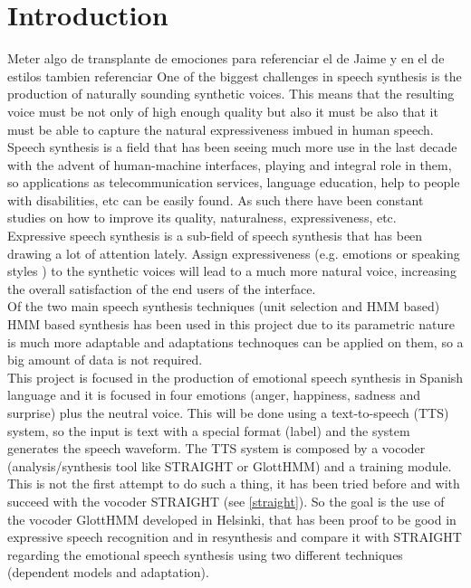 \section{Introduction}\label{introduction}
Meter algo de transplante de emociones para referenciar el de Jaime y en el de estilos tambien referenciar
One of the biggest challenges in speech synthesis is the production of naturally sounding synthetic voices. This means that the resulting voice must be not only of high enough quality but also it must be also that it must be able to capture the natural expressiveness imbued in human speech.\\
Speech synthesis is a field that has been seeing much more use in the last decade with the advent of human-machine interfaces, playing and integral role in them, so applications as telecommunication services, language education, help to people with disabilities, etc can be easily found. As such there have been constant studies on how to improve its quality, naturalness, expressiveness, etc.\\
Expressive speech synthesis is a sub-field of speech synthesis that has been drawing a lot of attention lately. Assign expressiveness (e.g. emotions \cite{emociones} or speaking styles \cite{jaime speaking styles}) to the synthetic voices will lead to a much more natural voice, increasing the overall satisfaction of the end users of the interface.\\
Of the two main speech synthesis techniques (unit selection \cite{emospeech} and HMM based) HMM based synthesis has been used in this project due to its parametric nature is much more adaptable and adaptations technoques can be applied on them, so a big amount of data is not required.\\
This project is focused in the production of emotional speech synthesis in Spanish language and it is focused in four emotions (anger, happiness, sadness and surprise) plus the neutral voice. This will be done using a text-to-speech (TTS) system, so the input is text with a special format (label) and the system generates the speech waveform. The TTS system is composed by a vocoder (analysis/synthesis tool like STRAIGHT or GlottHMM) and a training module.\\
This is not the first attempt to do such a thing, it has been tried before and with succeed with the vocoder STRAIGHT (see \ref{straight}). So the goal is the use of the vocoder GlottHMM developed in Helsinki, that has been proof to be good in expressive speech recognition \cite{Lorenzo-Trueba2013} and in resynthesis \cite{manu} and compare it with STRAIGHT regarding the emotional speech synthesis using two different techniques (dependent models and adaptation). \\

